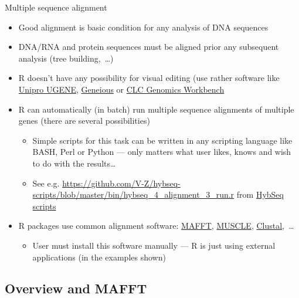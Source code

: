 \documentclass[compress, ucs, xelatex, 11pt, xcolor=svgnames, aspectratio=169,
	hyperref={
		bookmarks=true,
		unicode=true,
		colorlinks=true,
		pdftitle={Molecular data in R},
		plainpages=false,
		pdfauthor={Vojtech Zeisek},
		pdfsubject={Course about phylogeny and evolution in R},
		pdfcreator={XeLaTeX},
		pdfkeywords={R, evolution, phylogeny, molecular data},
		linkcolor=Crimson, %
		anchorcolor=Magenta, %
		citecolor=Magenta, %
		filecolor=Magenta, %
		menucolor=Magenta, %
		urlcolor=DodgerBlue, %
		pdftex},
	url={hyphens, lowtilde} %
	]{beamer}
\begin{document}
\begin{frame}{Multiple sequence alignment}
	\label{alignment}
	\begin{itemize}
		\item Good alignment is basic condition for any analysis of DNA sequences
		\item DNA/RNA and protein sequences must be aligned prior any subsequent analysis (tree building,~\ldots)
		\item R doesn't have any possibility for visual editing (use rather software like \href{https://ugene.net/}{Unipro UGENE}, \href{https://www.geneious.com/}{Geneious} or \href{https://digitalinsights.qiagen.com/products-overview/analysis-and-visualization/qiagen-clc-genomics-workbench/}{CLC Genomics Workbench}
		\item R can automatically (in batch) run multiple sequence alignments of multiple genes (there are several possibilities)
		\begin{itemize}
			\item Simple scripts for this task can be written in any scripting language like BASH, Perl or Python --- only matters what user likes, knows and wish to do with the results\ldots
			\item See e.g. \url{https://github.com/V-Z/hybseq-scripts/blob/master/bin/hybseq_4_alignment_3_run.r} from \href{https://github.com/V-Z/hybseq-scripts}{HybSeq scripts}
		\end{itemize}
		\item R packages use common alignment software: \href{https://mafft.cbrc.jp/alignment/software/}{MAFFT}, \href{https://www.drive5.com/muscle/}{MUSCLE}, \href{http://clustal.org/}{Clustal},~\ldots
		\begin{itemize}
			\item User must install this software manually --- R is just using external applications (in the examples shown)
		\end{itemize}
	\end{itemize}
\end{frame}

\subsection{Overview and MAFFT}
\end{document}
